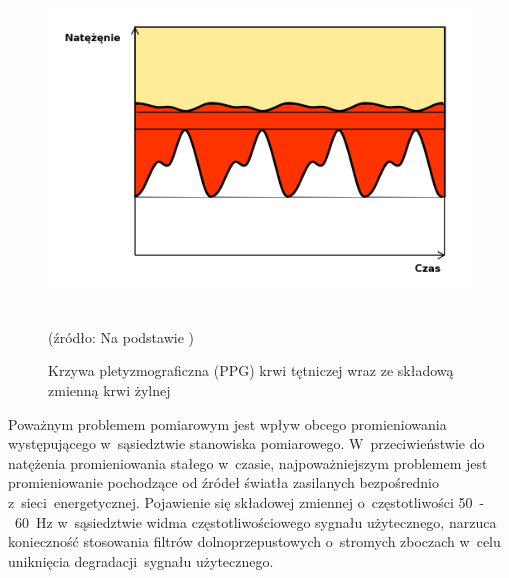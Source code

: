 \begin{figure}[h]
\centerline{\includegraphics[scale = 0.36]{graphic/vein}}
	\caption{Krzywa pletyzmograficzna (PPG) krwi tętniczej wraz ze składową zmienną krwi żylnej}
		
	\label{rys:vein}
	~\\
	(źródło: Na podstawie \cite{Dwyer:2008})
\end{figure}

Poważnym problemem pomiarowym jest wpływ obcego promieniowania występującego w~sąsiedztwie stanowiska pomiarowego. W~przeciwieństwie do natężenia promieniowania stałego w~czasie, najpoważniejszym 
problemem jest promieniowanie pochodzące od źródeł światła zasilanych bezpośrednio z~sieci~energetycznej. 
Pojawienie się składowej zmiennej o~częstotliwości 50~-~60~Hz w~sąsiedztwie widma częstotliwościowego sygnału użytecznego, narzuca konieczność stosowania filtrów dolnoprzepustowych o~stromych zboczach 
w~celu uniknięcia degradacji~sygnału użytecznego.


